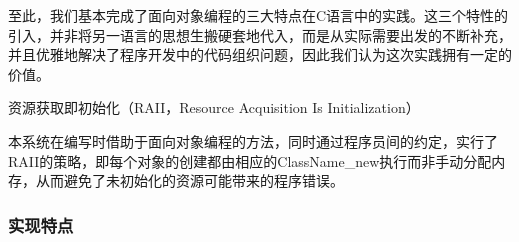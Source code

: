 \begin{DoxyEnumerate}
至此，我们基本完成了{\ttfamily 面向对象编程}的三大特点在{\ttfamily C}语言中的实践。这三个特性的引入，并非将另一语言的思想生搬硬套地代入，而是从实际需要出发的不断补充，并且优雅地解决了程序开发中的代码组织问题，因此我们认为这次实践拥有一定的价值。
\item 资源获取即初始化（\-R\-A\-I\-I，\-Resource Acquisition Is Initialization）

本系统在编写时借助于面向对象编程的方法，同时通过程序员间的约定，实行了{\ttfamily R\-A\-I\-I}的策略，即每个对象的创建都由相应的{\ttfamily Class\-Name\-\_\-new}执行而非手动分配内存，从而避免了未初始化的资源可能带来的程序错误。
\end{DoxyEnumerate}

\subsubsection*{实现特点}


